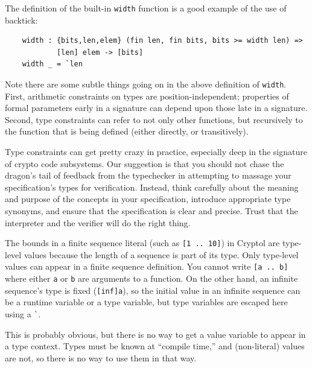 The definition of the built-in {\tt width} function is a good example
of the use of backtick:
\begin{Verbatim}
    width : {bits,len,elem} (fin len, fin bits, bits >= width len) =>
            [len] elem -> [bits]
    width _ = `len
\end{Verbatim}

\begin{tip}
  Note there are some subtle things going on in the above definition
  of \texttt{width}.  First, arithmetic constraints on types are
  position-independent; properties of formal parameters early in a
  signature can depend upon those late in a signature.  Second, type
  constraints can refer to not only other functions, but recursively
  to the function that is being defined (either directly, or
  transitively).

  Type constraints can get pretty crazy in practice, especially deep
  in the signature of crypto code subsystems.  Our suggestion is that
  you should not chase the dragon's tail of feedback from the
  typechecker in attempting to massage your specification's types for
  verification.  Instead, think carefully about the meaning and
  purpose of the concepts in your specification, introduce appropriate
  type synonyms, and ensure that the specification is clear and
  precise.  Trust that the interpreter and the verifier will do the
  right thing.
\end{tip}

The bounds in a finite sequence literal (such as {\tt [1 .. 10]}) in
Cryptol are type-level values because the length of a sequence is part
of its type.  Only type-level values can appear in a finite sequence
definition.  You cannot write {\tt [a .. b]} where either {\tt a} or
{\tt b} are arguments to a function.  On the other hand, an infinite
sequence's type is fixed ({\tt [inf]a}), so the initial value in an
infinite sequence can be a runtime variable or a type variable, but
type variables are escaped here using a {\tt \Verb|`|}.



This is probably obvious, but there is no way to get a value variable
to appear in a type context.  Types must be known at ``compile time,''
and (non-literal) values are not, so there is no way to use them in
that way.

